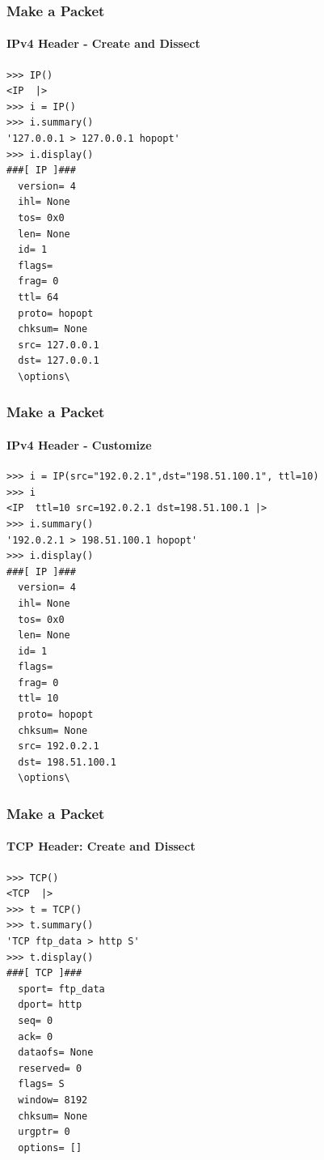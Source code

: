 \documentclass[handout,notes]{beamer}
\begin{document}
\begin{frame}[fragile]
\frametitle{Make a Packet}
\framesubtitle{IPv4 Header - Create and Dissect}
\begin{lstlisting}[caption={Creating and Dissecting an IPv4 Header}]
>>> IP()
<IP  |>
>>> i = IP()
>>> i.summary()
'127.0.0.1 > 127.0.0.1 hopopt'
>>> i.display()
###[ IP ]### 
  version= 4
  ihl= None
  tos= 0x0
  len= None
  id= 1
  flags= 
  frag= 0
  ttl= 64
  proto= hopopt
  chksum= None
  src= 127.0.0.1
  dst= 127.0.0.1
  \options\
\end{lstlisting}
\end{frame}

\begin{frame}[fragile]
\frametitle{Make a Packet}
\framesubtitle{IPv4 Header - Customize}
\begin{lstlisting}[caption={Customizing an IPv4 Header\footnote{These IP addresses have been reserved for use in documentation and examples, and should not be used publicly\cite{rfc5737}.}}]
>>> i = IP(src="192.0.2.1",dst="198.51.100.1", ttl=10)
>>> i
<IP  ttl=10 src=192.0.2.1 dst=198.51.100.1 |>
>>> i.summary()
'192.0.2.1 > 198.51.100.1 hopopt'
>>> i.display()
###[ IP ]### 
  version= 4
  ihl= None
  tos= 0x0
  len= None
  id= 1
  flags= 
  frag= 0
  ttl= 10
  proto= hopopt
  chksum= None
  src= 192.0.2.1
  dst= 198.51.100.1
  \options\
\end{lstlisting}
\end{frame}


\begin{frame}[fragile]
\frametitle{Make a Packet}
\framesubtitle{TCP Header: Create and Dissect}
\begin{lstlisting}[caption={Creating and Dissecting a TCP Header}]
>>> TCP()
<TCP  |>
>>> t = TCP()
>>> t.summary()
'TCP ftp_data > http S'
>>> t.display()
###[ TCP ]### 
  sport= ftp_data
  dport= http
  seq= 0
  ack= 0
  dataofs= None
  reserved= 0
  flags= S
  window= 8192
  chksum= None
  urgptr= 0
  options= []

\end{lstlisting}
\end{frame}
\end{document}

